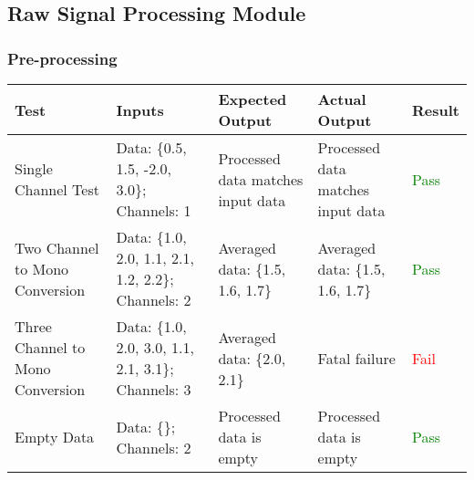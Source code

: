 \documentclass[12pt, titlepage]{article}
\begin{document}
\subsection{Raw Signal Processing Module}
\subsubsection{Pre-processing}
\begin{longtable}{|L{3cm}|L{3cm}|L{2.5cm}|L{2.5cm}|l|}
  \hline
  \textbf{Test} & \textbf{Inputs} & \textbf{Expected Output} & \textbf{Actual Output} & \textbf{Result} \\
  \hline
  Single Channel Test &
    Data: \{0.5, 1.5, -2.0, 3.0\}; \newline
    Channels: 1 &
    Processed data matches input data &
    Processed data matches input data &
    \textcolor{green}{Pass} \\
  \hline
  Two Channel to Mono Conversion &
    Data: \{1.0, 2.0, 1.1, 2.1, 1.2, 2.2\}; \newline
    Channels: 2 &
    Averaged data: \{1.5, 1.6, 1.7\} &
    Averaged data: \{1.5, 1.6, 1.7\} &
    \textcolor{green}{Pass} \\
  \hline
  Three Channel to Mono Conversion &
    Data: \{1.0, 2.0, 3.0, 1.1, 2.1, 3.1\}; \newline
    Channels: 3 &
    Averaged data: \{2.0, 2.1\} &
    Fatal failure &
    \textcolor{red}{Fail} \\
  \hline
  Empty Data &
    Data: \{\}; \newline
    Channels: 2 &
    Processed data is empty &
    Processed data is empty &
    \textcolor{green}{Pass} \\
  \hline
\end{longtable}
\end{document}
